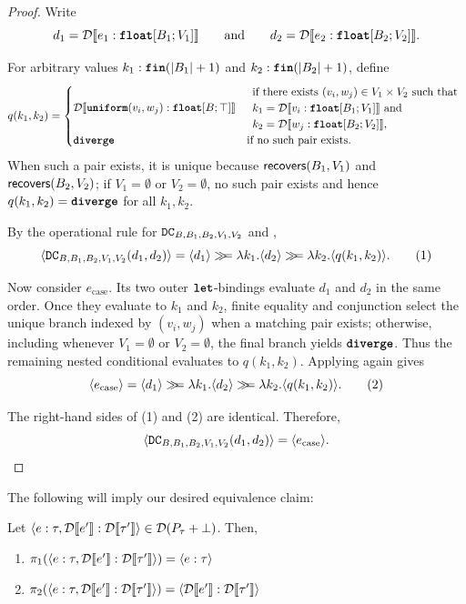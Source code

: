 \begin{proof}
Write
\[
	d_1=\mathcal{D}\llbracket e_1:\textnormal{\ttfamily\bfseries float}[B_1;V_1] \rrbracket
	\qquad\text{and}\qquad
	d_2=\mathcal{D}\llbracket e_2:\textnormal{\ttfamily\bfseries float}[B_2;V_2] \rrbracket.
\]

For arbitrary values $k_1:\textnormal{\ttfamily\bfseries fin}(|B_1|+1)$ and
$k_2:\textnormal{\ttfamily\bfseries fin}(|B_2|+1)$, define
\[
	q(k_1,k_2)
	=
	\begin{cases}
		\mathcal{D}\llbracket \textnormal{\ttfamily\bfseries uniform}(v_i,w_j):\textnormal{\ttfamily\bfseries float}[B;\top] \rrbracket
		& \begin{array}{l}
			\text{if there exists }(v_i,w_j)\in V_1\times V_2\text{ such that}\\
			k_1=\mathcal{D}\llbracket v_i:\textnormal{\ttfamily\bfseries float}[B_1;V_1] \rrbracket\text{ and }\\
			k_2=\mathcal{D}\llbracket w_j:\textnormal{\ttfamily\bfseries float}[B_2;V_2] \rrbracket,
		  \end{array}\\[1ex]
		\textnormal{\ttfamily\bfseries diverge} & \text{if no such pair exists}.
	\end{cases}
\]
When such a pair exists, it is unique because
$\mathsf{recovers}(B_1, V_1)$ and
$\mathsf{recovers}(B_2, V_2)$; if $V_1=\emptyset$ or
$V_2=\emptyset$, no such pair exists and hence
$q(k_1,k_2)=\textnormal{\ttfamily\bfseries diverge}$ for all $k_1,k_2$.

By the operational rule for $\texttt{DC}_{B,B_1,B_2,V_1,V_2}$ and
,
\[
	\langle \texttt{DC}_{B,B_1,B_2,V_1,V_2}(d_1,d_2) \rangle
	=
	\langle d_1 \rangle
	\gg\!\!=
	\lambda k_1.
	\langle d_2 \rangle
	\gg\!\!=
	\lambda k_2.
	\langle q(k_1,k_2) \rangle.
	\tag{1}
\]

Now consider $e_{\mathrm{case}}$. Its two outer
$\textnormal{\ttfamily\bfseries let}$-bindings evaluate $d_1$ and $d_2$ in the same order.
Once they evaluate to $k_1$ and $k_2$, finite equality and
conjunction select the unique branch indexed by $(v_i,w_j)$ when a
matching pair exists; otherwise, including whenever $V_1=\emptyset$
or $V_2=\emptyset$, the final branch yields $\textnormal{\ttfamily\bfseries diverge}$.
Thus the remaining nested conditional evaluates to $q(k_1,k_2)$.
Applying  again gives
\[
	\langle e_{\mathrm{case}} \rangle
	=
	\langle d_1 \rangle
	\gg\!\!=
	\lambda k_1.
	\langle d_2 \rangle
	\gg\!\!=
	\lambda k_2.
	\langle q(k_1,k_2) \rangle.
	\tag{2}
\]

The right-hand sides of (1) and (2) are identical. Therefore,
\[
	\langle \texttt{DC}_{B,B_1,B_2,V_1,V_2}(d_1,d_2) \rangle
	=
	\langle e_{\mathrm{case}} \rangle.
	\qedhere
\]
\end{proof}


The following will imply our desired equivalence claim:

\begin{lemma}\label{lem:big_step_coupling_props}
	Let $\langle e : \tau, \mathcal{D}\llbracket e' \rrbracket : \mathcal{D}\llbracket \tau' \rrbracket \rangle \in \mathcal{D}(P_{\tau} + \bot)$. Then,
	\begin{enumerate}
		\item\label{lem:big_step_coupling_props1} $\pi_1(\langle e : \tau, \mathcal{D}\llbracket e' \rrbracket : \mathcal{D}\llbracket \tau' \rrbracket \rangle) = \langle e : \tau \rangle$
		\item\label{lem:big_step_coupling_props2} $\pi_2(\langle e : \tau, \mathcal{D}\llbracket e' \rrbracket : \mathcal{D}\llbracket \tau' \rrbracket \rangle) = \langle \mathcal{D}\llbracket e' \rrbracket : \mathcal{D}\llbracket \tau' \rrbracket \rangle$
	\end{enumerate}
\end{lemma}

